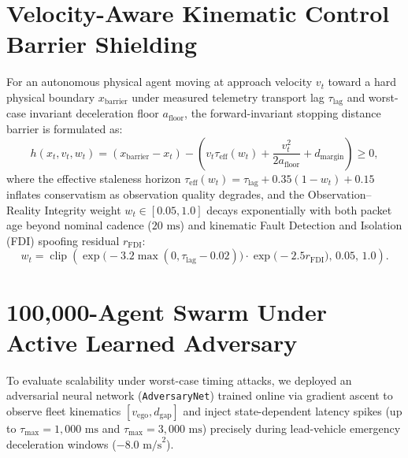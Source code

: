 \section{Velocity-Aware Kinematic Control Barrier Shielding}
For an autonomous physical agent moving at approach velocity $v_t$ toward a hard physical boundary $x_{\mathrm{barrier}}$ under measured telemetry transport lag $\tau_{\mathrm{lag}}$ and worst-case invariant deceleration floor $a_{\mathrm{floor}}$, the forward-invariant stopping distance barrier is formulated as:
\begin{equation}
\label{eq:ch13_linear_staleness_barrier}
h(x_t, v_t, w_t) = (x_{\mathrm{barrier}} - x_t) - \left(v_t \tau_{\mathrm{eff}}(w_t) + \frac{v_t^2}{2 a_{\mathrm{floor}}} + d_{\mathrm{margin}}\right) \ge 0,
\end{equation}
where the effective staleness horizon $\tau_{\mathrm{eff}}(w_t) = \tau_{\mathrm{lag}} + 0.35(1 - w_t) + 0.15$ inflates conservatism as observation quality degrades, and the Observation--Reality Integrity weight $w_t \in [0.05, 1.0]$ decays exponentially with both packet age beyond nominal cadence ($20\text{ ms}$) and kinematic Fault Detection and Isolation (FDI) spoofing residual $r_{\mathrm{FDI}}$:
\begin{equation}
\label{eq:ch13_oqe_weight}
w_t = \operatorname{clip}\!\left(\exp\!\big(-3.2 \max(0, \tau_{\mathrm{lag}} - 0.02)\big) \cdot \exp\!\big(-2.5 r_{\mathrm{FDI}}\big),\, 0.05,\, 1.0\right).
\end{equation}

\section{100,000-Agent Swarm Under Active Learned Adversary}
To evaluate scalability under worst-case timing attacks, we deployed an adversarial neural network (\texttt{AdversaryNet}) trained online via gradient ascent to observe fleet kinematics $[v_{\mathrm{ego}}, d_{\mathrm{gap}}]$ and inject state-dependent latency spikes (up to $\tau_{\max} = 1,000\text{ ms}$ and $\tau_{\max} = 3,000\text{ ms}$) precisely during lead-vehicle emergency deceleration windows ($-8.0\text{ m/s}^2$).

